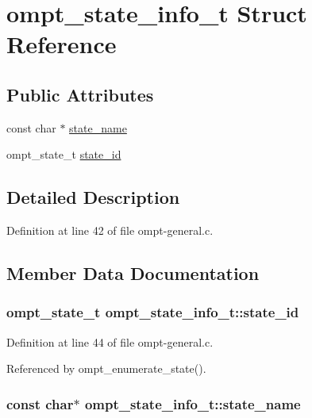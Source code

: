\hypertarget{structompt__state__info__t}{\section{ompt\-\_\-state\-\_\-info\-\_\-t Struct Reference}
\label{structompt__state__info__t}
}
\subsection*{Public Attributes}
\begin{DoxyCompactItemize}
\item 
const char $\ast$ \hyperlink{structompt__state__info__t_ae5fd48941be722a3a151e8630c33cad9}{state\-\_\-name}
\item 
ompt\-\_\-state\-\_\-t \hyperlink{structompt__state__info__t_a884c0a4f26b854517671f78a346a530a}{state\-\_\-id}
\end{DoxyCompactItemize}


\subsection{Detailed Description}


Definition at line 42 of file ompt-\/general.\-c.



\subsection{Member Data Documentation}
\hypertarget{structompt__state__info__t_a884c0a4f26b854517671f78a346a530a}{
\subsubsection[{state\-\_\-id}]{\setlength{\rightskip}{0pt plus 5cm}ompt\-\_\-state\-\_\-t ompt\-\_\-state\-\_\-info\-\_\-t\-::state\-\_\-id}}\label{structompt__state__info__t_a884c0a4f26b854517671f78a346a530a}


Definition at line 44 of file ompt-\/general.\-c.



Referenced by ompt\-\_\-enumerate\-\_\-state().

\hypertarget{structompt__state__info__t_ae5fd48941be722a3a151e8630c33cad9}{
\subsubsection[{state\-\_\-name}]{\setlength{\rightskip}{0pt plus 5cm}const char$\ast$ ompt\-\_\-state\-\_\-info\-\_\-t\-::state\-\_\-name}}\label{structompt__state__info__t_ae5fd48941be722a3a151e8630c33cad9}


